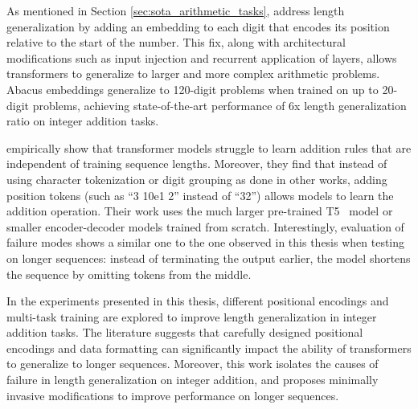 As mentioned in Section \ref{sec:sota_arithmetic_tasks}, \cite{mcleish_transformers_2024} address length generalization by adding an embedding to each digit that encodes its position relative to the start of the number. This fix, along with architectural modifications such as input injection and recurrent application of layers, allows transformers to generalize to larger and more complex arithmetic problems. Abacus embeddings generalize to 120-digit problems when trained on up to 20-digit problems, achieving state-of-the-art performance of 6x length generalization ratio on integer addition tasks.

\cite{nogueira_investigating_2021} empirically show that transformer models struggle to learn addition rules that are independent of training sequence lengths. Moreover, they find that instead of using character tokenization or digit grouping as done in other works, adding position tokens (such as ``3 10e1 2'' instead of ``32'') allows models to learn the addition operation. Their work uses the much larger pre-trained T5~\parencite{raffel_exploring_2020} model or smaller encoder-decoder models trained from scratch. Interestingly, evaluation of failure modes shows a similar one to the one observed in this thesis when testing on longer sequences: instead of terminating the output earlier, the model shortens the sequence by omitting tokens from the middle.

In the experiments presented in this thesis, different positional encodings and multi-task training are explored to improve length generalization in integer addition tasks. The literature suggests that carefully designed positional encodings and data formatting can significantly impact the ability of transformers to generalize to longer sequences. Moreover, this work isolates the causes of failure in length generalization on integer addition, and proposes minimally invasive modifications to improve performance on longer sequences.